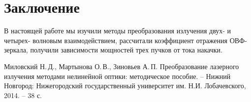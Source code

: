 \documentclass[a5paper,11pt]{extarticle}
\begin{document}
\section*{Заключение}
В настоящей работе мы изучили методы преобразования излучения двух- и четырех- волновым взаимодействием, рассчитали коэффициент отражения ОВФ-зеркала, получили зависимости мощностей трех пучков от тока накачки.

\begin{thebibliography}{}
   Миловский Н.\,Д., Мартынова О.\,В., Зиновьев А.\,П. Преобразование лазерного излучения методами нелинейной оптики: методическое пособие. -- Нижний Новгород: Нижегородский государственный университет им. Н.И. Лобачевского, 2014. -- 38 с.
    
\end{thebibliography}
\end{document}
